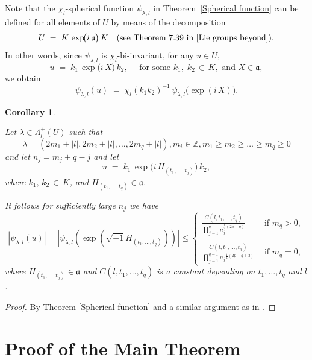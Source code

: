 \documentclass[11pt,a4paper]{amsart}
\newtheorem{corollary}[theorem]{Corollary}
\theoremstyle{definition}
\numberwithin{equation}{section}
\begin{document}
 
 \noindent
 \noindent
Note that the $\chi_l$-spherical function $\psi_{\lambda,l}$ in 
Theorem~\ref{Spherical function} can be defined for all elements of $U$ 
by means of the decomposition 
\[
U \;=\; K\,\exp\!\bigl(i\,\mathfrak{a}\bigr)\,K
\quad (\text{see Theorem 7.39 in \cite{Lie groups beyond}}).
\]
In other words, since $\psi_{\lambda,l}$  is $\chi_l$-bi-invariant, for any $u \in U$, 
\[
u \;=\; k_1\,\exp\!\bigl(i\,X\bigr)\,k_2,
\quad \text{ for some }
k_1, \; k_2 \,\in\, K, \text{ and } X\in \mathfrak{a},
\]
we obtain
\[
\psi_{\lambda,l}(u)
\;=\;
\chi_l(k_1 k_2)^{-1}\,\psi_{\lambda,l}\bigl(\exp(i\,X)\bigr).
\]
\begin{corollary}
 \label{estimation}

Let  $ \lambda\in \Lambda_l^+\left(U \right)$ such that  $$ \lambda= ( 2m_1+|l|, 2m_2+|l| , \dots , 2 m_q+|l|), m_i\in \mathbb{Z} , m_1\geq m_2 \geq \dots \geq m_q\geq 0$$  and let $n_j=m_j+q-j$ and let
\[
u \;=\; k_1\,\exp\!\bigl(i\,H_{\left(t_{1},...,t_{q}\right)}\bigr)\,k_2,
\]
 where 
\(k_1, \,  k_2 \,\in\, K\),  and  \(H_{\left(t_{1},...,t_{q}\right)}\in \mathfrak{a}\).

It follows  for sufficiently large $n_j$ we have 
\[	
\left\vert \psi_{{\lambda,l}}\left(u
  \right)\right\vert= \left\vert \psi_{{\lambda,l}}\left(\exp\left(\sqrt{-1}H_{\left(t_{1},...,t_{q}\right)}
\right)  \right)\right\vert \leq \begin{cases}
   \frac{C\left(l, t_1, \dots, t_q \right) }{ {\prod\limits_{j=1}^{q}} n_j^{\frac{1}{2}(2p-q)}  }&\mbox{ if } m_q>0,  \\\\  \frac{C\left(l, t_1, \dots, t_q \right)}{{\prod\limits_{j=1}^{q-1}}{n_{j}}^{\frac{1}{2} (2p-q+3)}} &\mbox{ if }  m_q=0,
 \end{cases}
 \]
where $H_{(t_1,\dots,t_q)}\in \mathfrak{a}$ and  $C\left(l, t_1, \dots, t_q \right) $ is a constant depending on $t_1, \dots, t_q$ and $l$.
\end{corollary}
\begin{proof}
By Theorem \ref{Spherical function} and a similar argument as in \cite{Alhashami}.
\end{proof}





\section{Proof of the Main Theorem} \label{Proof of the Main Theorem}
\end{document}
